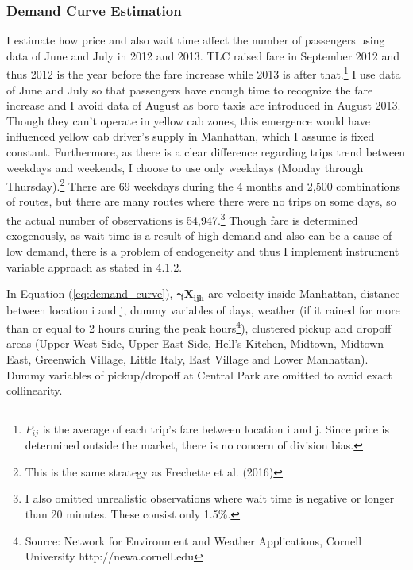 \vspace{0.5cm}
\subsubsection{Demand Curve Estimation}
\hspace{0.5cm} I estimate how price and also wait time affect the number of passengers using data of June and July in 2012 and 2013. TLC raised fare in September 2012 and thus 2012 is the year before the fare increase while 2013 is after that.\footnote{$P_{ij}$ is the average of each trip's fare between location i and j. Since price is determined outside the market, there is no concern of division bias.} I use data of June and July so that passengers have enough time to recognize the fare increase and I avoid data of August as boro taxis are introduced in August 2013. Though they can't operate in yellow cab zones, this emergence would have influenced yellow cab driver's supply in Manhattan, which I assume is fixed constant. Furthermore, as there is a clear difference regarding trips trend between weekdays and weekends, I choose to use only weekdays (Monday through Thursday).\footnote{This is the same strategy as Frechette et al. (2016)} There are 69 weekdays during the 4 months and 2,500 combinations of routes, but there are many routes where there were no trips on some days, so the actual number of observations is 54,947.\footnote{I also omitted unrealistic observations where wait time is negative or longer than 20 minutes. These consist only 1.5\%.} Though fare is determined exogenously, as wait time is a result of high demand and also can be a cause of low demand, there is a problem of endogeneity and thus I implement instrument variable approach as stated in 4.1.2. 

In Equation (\ref{eq:demand_curve}), $\mathbf{\bm{\gamma} X_{ijh}}$ are velocity inside Manhattan, distance between location i and j, dummy variables of days, weather (if it rained for more than or equal to 2 hours during the peak hours\footnote{Source: Network for Environment and Weather Applications, Cornell University http://newa.cornell.edu}), clustered pickup and dropoff areas (Upper West Side, Upper East Side, Hell's Kitchen, Midtown, Midtown East, Greenwich Village, Little Italy, East Village and Lower Manhattan). Dummy variables of pickup/dropoff at Central Park are omitted to avoid exact collinearity.



